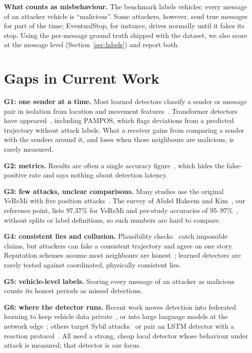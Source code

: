 \documentclass[conference]{IEEEtran}
\begin{document}
\textbf{What counts as misbehaviour.} The benchmark labels vehicles: every message of an attacker vehicle is ``malicious''. Some attackers,
however, send true messages for part of the time; EventualStop, for instance, drives normally until it fakes its stop. Using the per-message ground
truth shipped with the dataset, we also score at the message level (Section~\ref{sec:labels}) and report both.

\section{Gaps in Current Work}
\label{sec:gaps}
\textbf{G1: one sender at a time.} Most learned detectors classify a sender or message pair in isolation from location and
movement features~\cite{so2018, singh2019, sharma2022}. Transformer detectors have appeared~\cite{li2025attentionguard, kalogiannis2026pampos},
including PAMPOS, which flags deviations from a predicted trajectory without attack labels. What a receiver gains from comparing a sender with
the senders around it, and loses when those neighbours are malicious, is rarely measured.

\textbf{G2: metrics.} Results are often a single accuracy figure~\cite{hakeem2025}, which hides the false-positive rate and says nothing about
detection latency.

\textbf{G3: few attacks, unclear comparisons.} Many studies use the original VeReMi with five position attacks~\cite{vanderheijden2018}.
The survey of Abdel Hakeem and Kim~\cite{hakeem2025}, our reference point, lists 97.37\% for VeReMi and per-study accuracies of
95--97\%~\cite{so2018, singh2019}, without splits or label definitions, so such numbers are hard to compare.

\textbf{G4: consistent lies and collusion.} Plausibility checks~\cite{so2019} catch impossible claims, but attackers can fake a
consistent trajectory and agree on one story. Reputation schemes assume most neighbours are
honest~\cite{gyawali2020}; learned detectors are rarely tested against coordinated, physically consistent lies.

\textbf{G5: vehicle-level labels.} Scoring every message of an attacker as malicious counts its honest periods as missed detections.

\textbf{G6: where the detector runs.} Recent work moves detection into federated learning to keep vehicle data
private~\cite{marmol2024, demir2025}, or into large language models at the network edge~\cite{hamhoum2024}; others target Sybil
attacks~\cite{thomas2024, khan2026} or pair an LSTM detector with a reaction protocol~\cite{franceschini2024}. All need a strong, cheap
local detector whose behaviour under attack is measured; that detector is our focus.
\end{document}
